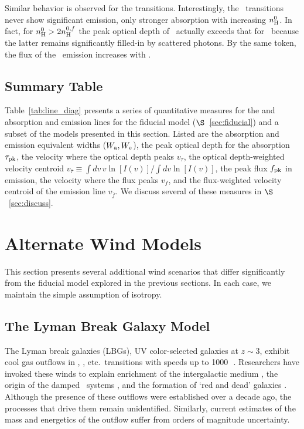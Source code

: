 \documentclass[12pt,preprint]{aastex}
\begin{document}
Similar behavior is observed for the  transitions.
Interestingly, the \feiia\ transitions never show significant emission,
only stronger absorption with increasing $n_{\rm H}^0$.  In fact, for $n_{\rm H}^0
> 2 n_{\rm H}^{0,f}$ the peak optical depth of \feiia\ actually exceeds that
for \feiib\ because the latter remains significantly filled-in by
scattered photons.  By the same token, the flux of the \feiic\
emission increases with \nhn.

\subsection{Summary Table}

Table~\ref{tab:line_diag} presents a series of quantitative measures
for the \ion{Mg}{2} and \ion{Fe}{2} absorption and emission lines for
the fiducial model ($\S$~\ref{sec:fiducial}) and a subset of the models
presented in this section.  Listed are the absorption and emission
equivalent widths ($W_{\rm a}, W_{\rm e}$), the peak optical depth
for the absorption $\tau_{\rm pk}$, the
velocity where the optical depth peaks $v_\tau$, the optical
depth-weighted velocity centroid $v_{\bar \tau} \equiv \int dv \, v
\ln[I(v)] / \int dv \ln[I(v)]$, the peak flux $f_{\rm pk}$ in
emission, the velocity where the flux peaks $v_f$, and the
flux-weighted velocity centroid of the emission line $v_{\bar f}$.
We discuss several of these measures in $\S$~\ref{sec:discuss}.


\section{Alternate Wind Models}
\label{sec:alternate}

This section presents several additional wind scenarios that differ
significantly from the fiducial model explored in the previous
sections.  In each case, we maintain the simple assumption of
isotropy.

\subsection{The Lyman Break Galaxy Model}
\label{sec:lbg}

The Lyman break galaxies (LBGs), UV color-selected galaxies at $z \sim 3$,
exhibit cool gas outflows in \ion{Si}{2}, \ion{C}{2},
etc.\ transitions with speeds up to 1000\,\kms\
\citep[e.g.][]{lkg+97,pks+98}.
Researchers have invoked these winds to explain enrichment of
the intergalactic medium \citep[e.g.][]{ahs+01,spa+06}, the origin of the
damped \lya\ systems \citep{nbf98,schaye01a}, and the formation of
`red and dead' galaxies \citep[e.g.][]{spf01}.  Although the
presence of these outflows were established over a decade ago,
the processes that drive them remain
unidentified.  Similarly,  current estimates of the mass and energetics of the
outflow suffer from orders of magnitude uncertainty.
\end{document}
